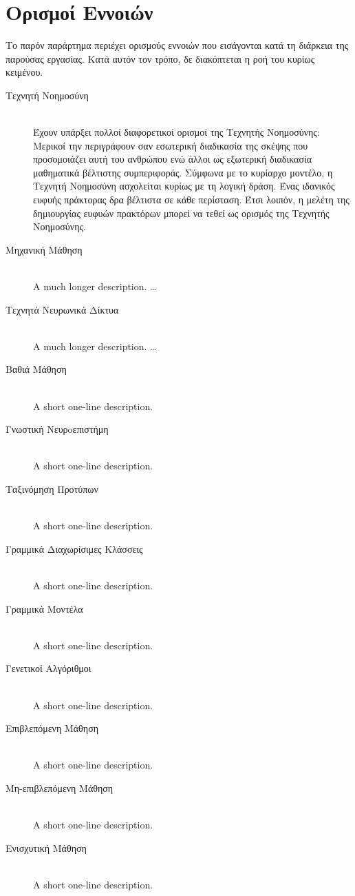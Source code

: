 \chapter{Ορισμοί Εννοιών}

Το παρόν παράρτημα περιέχει ορισμούς εννοιών που εισάγονται κατά τη διάρκεια της παρούσας εργασίας. Κατά αυτόν τον τρόπο, δε διακόπτεται η ροή του κυρίως κειμένου.

\begin{description}
    \item[Τεχνητή Νοημοσύνη] \hfill \\ 
    Έχουν υπάρξει πολλοί διαφορετικοί ορισμοί της Τεχνητής Νοημοσύνης: Μερικοί την περιγράφουν σαν εσωτερική διαδικασία της σκέψης που προσομοιάζει αυτή του ανθρώπου ενώ άλλοι ως εξωτερική διαδικασία μαθηματικά βέλτιστης συμπεριφοράς. Σύμφωνα με το κυρίαρχο μοντέλο, η Τεχνητή Νοημοσύνη ασχολείται κυρίως με τη λογική δράση. Ένας ιδανικός ευφυής πράκτορας δρα βέλτιστα σε κάθε περίσταση. Έτσι λοιπόν, η μελέτη της δημιουργίας ευφυών πρακτόρων μπορεί να τεθεί ως ορισμός της Τεχνητής Νοημοσύνης.
    \item[Μηχανική Μάθηση] \hfill \\ A much longer description.   \ldots
    \item[Τεχνητά Νευρωνικά Δίκτυα] \hfill \\ A much longer description.   \ldots
    \item[Βαθιά Μάθηση] \hfill \\ A short one-line description.
    \item[Γνωστική Νευρoεπιστήμη] \hfill \\ A short one-line description. 
    \item[Ταξινόμηση Προτύπων] \hfill \\ A short one-line description.  
    \item[Γραμμικά Διαχωρίσιμες Κλάσσεις] \hfill \\ A short one-line description.
    \item[Γραμμικά Μοντέλα] \hfill \\ A short one-line description.   
    \item[Γενετικοί Αλγόριθμοι] \hfill \\ A short one-line description.
    \item[Επιβλεπόμενη Μάθηση] \hfill \\ A short one-line description.  
    \item[Μη-επιβλεπόμενη Μάθηση] \hfill \\ A short one-line description.
    \item[Ενισχυτική Μάθηση] \hfill \\ A short one-line description.    
 \end{description}